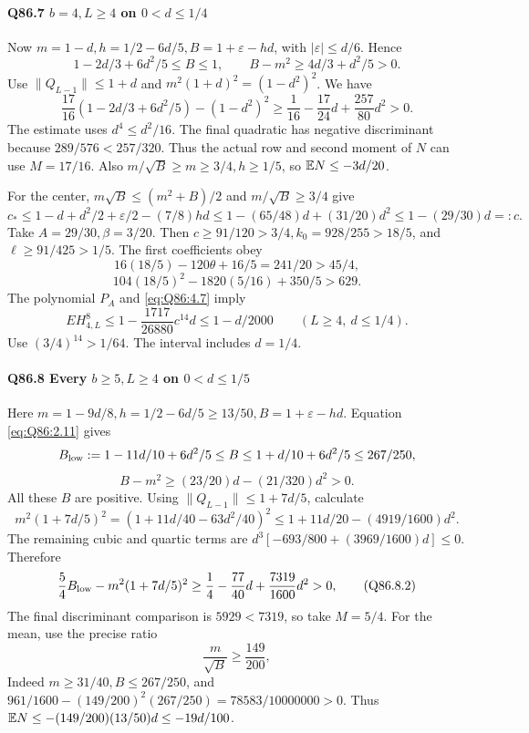 \paragraph{Q86.7 \(b=\allowbreak 4,\allowbreak L\ge\allowbreak 4\) on \(0<\allowbreak d\le\allowbreak 1/4\)}
Now \(m=\allowbreak 1-d,\allowbreak h=\allowbreak 1/2-6d/5,\allowbreak B=\allowbreak 1+\varepsilon-hd\), with
\(|\varepsilon|\le\allowbreak  d/6\). Hence
\[
1-2d/3+6d^2/5\le B\le1,
\qquad B-m^2\ge4d/3+d^2/5>0.
\tag{Q86.7.1}\label{eq:Q86:7.1}
\]
Use \(\|Q_{L-1}\|\le\allowbreak 1+d\) and
\(m^2(1+d)^2=\allowbreak (1-d^2)^2\). We have
\[
\frac{17}{16}(1-2d/3+6d^2/5)-(1-d^2)^2
\ge\frac1{16}-\frac{17}{24}d+\frac{257}{80}d^2>0.
\tag{Q86.7.2}\label{eq:Q86:7.2}
\]
The estimate uses \(d^4\le\allowbreak  d^2/16\).
The final quadratic has negative discriminant because
\(289/576<\allowbreak 257/320\).
Thus the actual row and second moment of \(N\) can use \(M=\allowbreak 17/16\).
Also \(m/\sqrt B\ge\allowbreak  m\ge\allowbreak 3/4,\allowbreak h\ge\allowbreak 1/5\), so
\(\mathbb E N\le\allowbreak -3d/20\).

For the center, \(m\sqrt B\le\allowbreak (m^2+B)/2\) and \(m/\sqrt B\ge\allowbreak 3/4\) give
\[
c_*\le1-d+d^2/2+\varepsilon/2-(7/8)hd
\le1-(65/48)d+(31/20)d^2
\le1-(29/30)d=:c.
\tag{Q86.7.3}\label{eq:Q86:7.3}
\]
Take \(A=\allowbreak 29/30,\allowbreak \beta=\allowbreak 3/20\).
Then \(c\ge\allowbreak 91/120>\allowbreak 3/4,\allowbreak k_0=\allowbreak 928/255>\allowbreak 18/5\), and
\(\ell\ge\allowbreak 91/425>\allowbreak 1/5\).
The first coefficients obey
\[
16(18/5)-120\theta+16/5=241/20>45/4,
\]
\[
104(18/5)^2-1820(5/16)+350/5>629.
\]
The polynomial \(P_A\) and \eqref{eq:Q86:4.7} imply
\[
E H_{4,L}^8\le1-\frac{1717}{26880}c^{14}d
\le1-d/2000\qquad(L\ge4,\ d\le1/4).
\tag{Q86.7.4}\label{eq:Q86:7.4}
\]
Use \((3/4)^{14}>\allowbreak 1/64\).
The interval includes \(d=\allowbreak 1/4\).

\paragraph{Q86.8 Every \(b\ge\allowbreak 5,\allowbreak L\ge\allowbreak 4\) on \(0<\allowbreak d\le\allowbreak 1/5\)}
Here \(m=\allowbreak 1-9d/8,\allowbreak h=\allowbreak 1/2-6d/5\ge\allowbreak 13/50,\allowbreak B=\allowbreak 1+\varepsilon-hd\).
Equation \eqref{eq:Q86:2.11} gives
\[
B_{\rm low}:=1-11d/10+6d^2/5\le B
\le1+d/10+6d^2/5\le267/250,
\]
\[
B-m^2\ge(23/20)d-(21/320)d^2>0.
\tag{Q86.8.1}\label{eq:Q86:8.1}
\]
All these \(B\) are positive.
Using \(\|Q_{L-1}\|\le\allowbreak 1+7d/5\), calculate
\[
m^2(1+7d/5)^2=(1+11d/40-63d^2/40)^2
\le1+11d/20-(4919/1600)d^2.
\]
The remaining cubic and quartic terms are
\(d^3[-693/800+(3969/1600)d]\le\allowbreak 0\).
Therefore
\[
\frac54 B_{\rm low}-m^2(1+7d/5)^2
\ge\frac14-\frac{77}{40}d+\frac{7319}{1600}d^2>0,
\tag{Q86.8.2}\label{eq:Q86:8.2}
\]
The final discriminant comparison is \(5929<\allowbreak 7319\), so take \(M=\allowbreak 5/4\).
For the mean, use the precise ratio
\[
\frac m{\sqrt B}\ge\frac{149}{200},
\tag{Q86.8.3}\label{eq:Q86:8.3}
\]
Indeed \(m\ge\allowbreak 31/40,\allowbreak B\le\allowbreak 267/250\), and
\(961/1600-(149/200)^2(267/250)=\allowbreak 78583/10000000>\allowbreak 0\).
Thus \(\mathbb E N\le\allowbreak -(149/200)(13/50)d\le\allowbreak -19d/100\).

